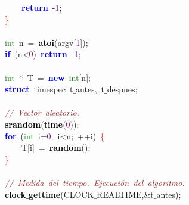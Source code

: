 \mbox{}\ \ \ \ \ \ \ \ \textbf{\textcolor{Blue}{return}}\ \textcolor{BrickRed}{-}\textcolor{Purple}{1}\textcolor{BrickRed}{;} \\
\mbox{}\ \ \ \ \textcolor{Red}{\}} \\
\mbox{} \\
\mbox{}\ \ \ \ \textcolor{ForestGreen}{int}\ n\ \textcolor{BrickRed}{=}\ \textbf{\textcolor{Black}{atoi}}\textcolor{BrickRed}{(}argv\textcolor{BrickRed}{[}\textcolor{Purple}{1}\textcolor{BrickRed}{]);}\ \ \ \  \\
\mbox{}\ \ \ \ \textbf{\textcolor{Blue}{if}}\ \textcolor{BrickRed}{(}n\textcolor{BrickRed}{\textless{}}\textcolor{Purple}{0}\textcolor{BrickRed}{)}\ \textbf{\textcolor{Blue}{return}}\ \textcolor{BrickRed}{-}\textcolor{Purple}{1}\textcolor{BrickRed}{;} \\
\mbox{}\ \ \ \  \\
\mbox{}\ \ \ \ \textcolor{ForestGreen}{int}\ \textcolor{BrickRed}{*}\ T\ \textcolor{BrickRed}{=}\ \textbf{\textcolor{Blue}{new}}\ \textcolor{ForestGreen}{int}\textcolor{BrickRed}{[}n\textcolor{BrickRed}{];} \\
\mbox{}\ \ \ \ \textbf{\textcolor{Blue}{struct}}\ \textcolor{TealBlue}{timespec}\ t$\_$antes\textcolor{BrickRed}{,}\ t$\_$despues\textcolor{BrickRed}{;} \\
\mbox{}\ \ \ \  \\
\mbox{}\ \ \ \ \textit{\textcolor{Brown}{//\ Vector\ aleatorio.}} \\
\mbox{}\ \ \ \ \textbf{\textcolor{Black}{srandom}}\textcolor{BrickRed}{(}\textbf{\textcolor{Black}{time}}\textcolor{BrickRed}{(}\textcolor{Purple}{0}\textcolor{BrickRed}{));} \\
\mbox{}\ \ \ \ \textbf{\textcolor{Blue}{for}}\ \textcolor{BrickRed}{(}\textcolor{ForestGreen}{int}\ i\textcolor{BrickRed}{=}\textcolor{Purple}{0}\textcolor{BrickRed}{;}\ i\textcolor{BrickRed}{\textless{}}n\textcolor{BrickRed}{;}\ \textcolor{BrickRed}{++}i\textcolor{BrickRed}{)}\ \textcolor{Red}{\{} \\
\mbox{}\ \ \ \ \ \ \ \ T\textcolor{BrickRed}{[}i\textcolor{BrickRed}{]}\ \textcolor{BrickRed}{=}\ \textbf{\textcolor{Black}{random}}\textcolor{BrickRed}{();} \\
\mbox{}\ \ \ \ \textcolor{Red}{\}} \\
\mbox{}\ \ \ \  \\
\mbox{}\ \ \ \ \textit{\textcolor{Brown}{//\ Medida\ del\ tiempo.\ Ejecución\ del\ algoritmo.}} \\
\mbox{}\ \ \ \ \textbf{\textcolor{Black}{clock$\_$gettime}}\textcolor{BrickRed}{(}CLOCK$\_$REALTIME\textcolor{BrickRed}{,\&}t$\_$antes\textcolor{BrickRed}{);} \\
